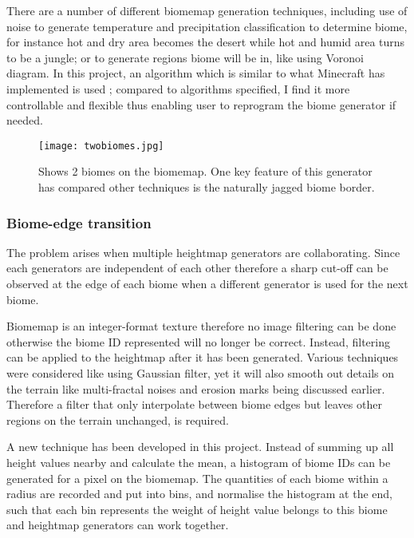 \documentclass[oneside, a4paper]{article}
\begin{document}
    There are a number of different biomemap generation techniques, including use of noise to generate temperature and precipitation classification to determine biome, for instance hot and dry area becomes the desert while hot and humid area turns to be a jungle; or to generate regions biome will be in, like using Voronoi diagram. In this project, an algorithm which is similar to what Minecraft has implemented is used \cite{mc_biome}; compared to algorithms specified, I find it more controllable and flexible thus enabling user to reprogram the biome generator if needed.

    \begin{figure}[H]
        \texttt{[image: twobiomes.jpg]}
        \caption{Shows 2 biomes on the biomemap. One key feature of this generator has compared other techniques is the naturally jagged biome border.}
    \end{figure}

    \subsubsection{Biome-edge transition}

    The problem arises when multiple heightmap generators are collaborating. Since each generators are independent of each other therefore a sharp cut-off can be observed at the edge of each biome when a different generator is used for the next biome.

    Biomemap is an integer-format texture therefore no image filtering can be done otherwise the biome ID represented will no longer be correct. Instead, filtering can be applied to the heightmap after it has been generated. Various techniques were considered like using Gaussian filter, yet it will also smooth out details on the terrain like multi-fractal noises and erosion marks being discussed earlier. Therefore a filter that only interpolate between biome edges but leaves other regions on the terrain unchanged, is required.

    A new technique has been developed in this project. Instead of summing up all height values nearby and calculate the mean, a histogram of biome IDs can be generated for a pixel on the biomemap. The quantities of each biome within a radius are recorded and put into bins, and normalise the histogram at the end, such that each bin represents the weight of height value belongs to this biome and heightmap generators can work together.
\end{document}
